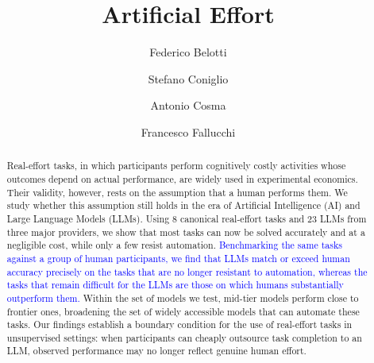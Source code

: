 \documentclass[12pt,a4paper]{article}
\title{Artificial Effort}
\author[1]{Federico Belotti}
\author[1]{Stefano Coniglio}
\author[1]{Antonio Cosma}
\author[1]{Francesco Fallucchi}
\affil[1]{University of Bergamo, Italy. Corresponding author: \href{mailto:francesco.fallucchi@unibg.it}{francesco.fallucchi@unibg.it}}
\newcommand{\blue}[1]{\textcolor{blue}{#1}}
\newcommand{\SC}[1]{\textcolor{violet}{SC: #1}}
\begin{document}
\maketitle

\begin{abstract}
Real-effort tasks, in which participants perform cognitively costly activities whose outcomes depend on actual performance, are widely used in experimental economics. Their validity, however, rests on the assumption that a human performs them. We study whether this assumption still holds in the era of Artificial Intelligence (AI) and Large Language Models (LLMs). Using 8 canonical real-effort tasks and 23 LLMs from three major providers, we show that most tasks can now be solved accurately and at a negligible cost, while only a few resist automation. \blue{Benchmarking the same tasks against a group of human participants, we find that LLMs match or exceed human accuracy precisely on the tasks that are no longer resistant to automation, whereas the tasks that remain difficult for the LLMs are those on which humans substantially outperform them.}
Within the set of models we test, mid-tier models perform close to frontier ones, broadening the set of widely accessible models that can automate these tasks. Our findings establish a boundary condition for the use of real-effort tasks in unsupervised settings: when participants can cheaply outsource task completion to an LLM, observed performance may no longer reflect genuine human effort.
\end{abstract}
\end{document}
